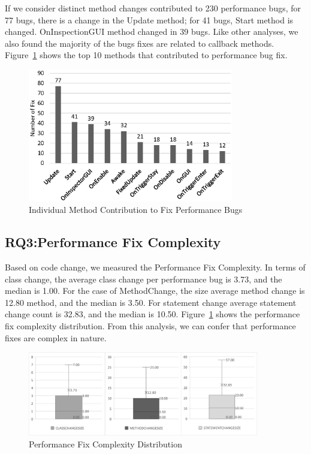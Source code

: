 If we consider distinct method changes contributed to 230 performance bugs, for 77 bugs, there is a change in the Update method; for 41 bugs, Start method is changed. OnInspectionGUI method changed in 39 bugs. Like other analyses, we also found the majority of the bugs fixes are related to callback methods. Figure~\ref{figure:rq2distinctmethod} shows the top 10 methods that contributed to performance bug fix.


\begin{figure}[t]
	\centering
	\includegraphics[width=0.8\textwidth]{figure/rq2_4.eps}
	\caption{Individual Method Contribution to Fix Performance Bugs}
	\label{figure:rq2distinctmethod}
\end{figure}


\subsection{RQ3:Performance Fix Complexity}
\label{subsec:bugcomplexity}

Based on code change, we measured the Performance Fix Complexity. In terms of class change, the average class change per performance bug is 3.73, and the median is 1.00. For the case of MethodChange, the size average method change is 12.80 method, and the median is 3.50.  For statement change average statement change count is 32.83, and the median is 10.50. Figure~\ref{figure:rq2distinctmethod} shows the performance fix complexity distribution. From this analysis, we can confer that performance fixes are complex in nature.

\begin{figure}[t]
	\centering
	\includegraphics[width=0.9\textwidth]{figure/rq3_1.eps}
	\caption{Performance Fix Complexity Distribution}
	\label{figure:rq3}
\end{figure}

